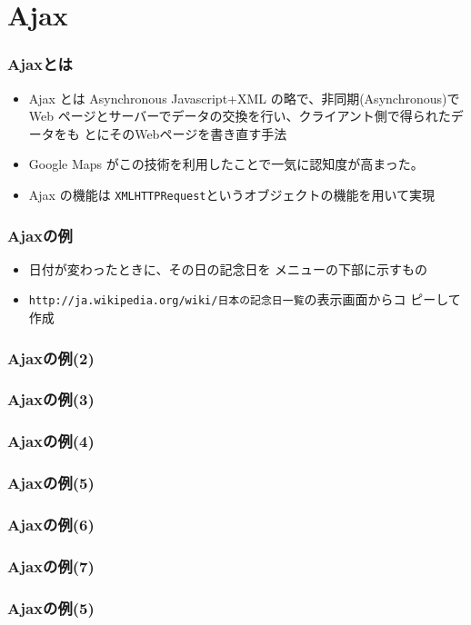  \section{Ajax}
\begin{frame}[containsverbatim]
\frametitle{Ajaxとは}
\begin{itemize}
 \item Ajax とは Asynchronous Javascript+XML の略で、非同期(Asynchronous)でWeb
ページとサーバーでデータの交換を行い、クライアント側で得られたデータをも
とにそのWebページを書き直す手法
 \item Google Maps がこの技術を利用したことで一気に認知度が高まった。
 \item Ajax の機能は \texttt{XMLHTTPRequest}というオブジェクトの機能を用いて実現
\end{itemize}\end{frame}
\begin{frame}[containsverbatim]
 \frametitle{Ajaxの例}
 \begin{itemize}
  \item 日付が変わったときに、その日の記念日を
 メニューの下部に示すもの
  \item \texttt{http://ja.wikipedia.org/wiki/日本の記念日一覧}の表示画面からコ
 ピーして作成
 \end{itemize}
\end{frame}
\begin{frame}[containsverbatim]
\frametitle{Ajaxの例(2)}
\end{frame}
\begin{frame}[containsverbatim]
\frametitle{Ajaxの例(3)}
\end{frame}
\begin{frame}[containsverbatim]
\frametitle{Ajaxの例(4)}
\end{frame}
\begin{frame}[containsverbatim]
\frametitle{Ajaxの例(5)}
\end{frame}
\begin{frame}[containsverbatim]
\frametitle{Ajaxの例(6)}
\end{frame}
\begin{frame}[containsverbatim]
\frametitle{Ajaxの例(7)}
\end{frame}
\begin{frame}[containsverbatim]
\frametitle{Ajaxの例(5)}
\end{frame}
